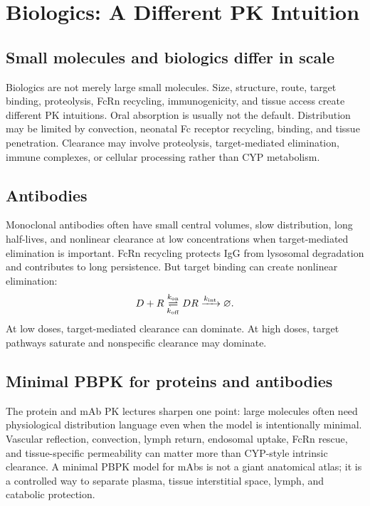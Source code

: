 \documentclass[a4paper]{article}
\begin{document}
\section{Biologics: A Different PK Intuition}

\subsection{Small molecules and biologics differ in scale}

Biologics are not merely large small molecules. Size, structure, route, target binding, proteolysis, FcRn recycling, immunogenicity, and tissue access create different PK intuitions. Oral absorption is usually not the default. Distribution may be limited by convection, neonatal Fc receptor recycling, binding, and tissue penetration. Clearance may involve proteolysis, target-mediated elimination, immune complexes, or cellular processing rather than CYP metabolism.

\subsection{Antibodies}

Monoclonal antibodies often have small central volumes, slow distribution, long half-lives, and nonlinear clearance at low concentrations when target-mediated elimination is important. FcRn recycling protects IgG from lysosomal degradation and contributes to long persistence. But target binding can create nonlinear elimination:
\[
  D+R
  \underset{k_{\mathrm{off}}}{\overset{k_{\mathrm{on}}}{\rightleftharpoons}}
  DR
  \xrightarrow{k_{\mathrm{int}}}
  \varnothing.
\]
At low doses, target-mediated clearance can dominate. At high doses, target pathways saturate and nonspecific clearance may dominate.

\subsection{Minimal PBPK for proteins and antibodies}

The protein and mAb PK lectures sharpen one point: large molecules often need physiological distribution language even when the model is intentionally minimal. Vascular reflection, convection, lymph return, endosomal uptake, FcRn rescue, and tissue-specific permeability can matter more than CYP-style intrinsic clearance. A minimal PBPK model for mAbs is not a giant anatomical atlas; it is a controlled way to separate plasma, tissue interstitial space, lymph, and catabolic protection.
\end{document}
